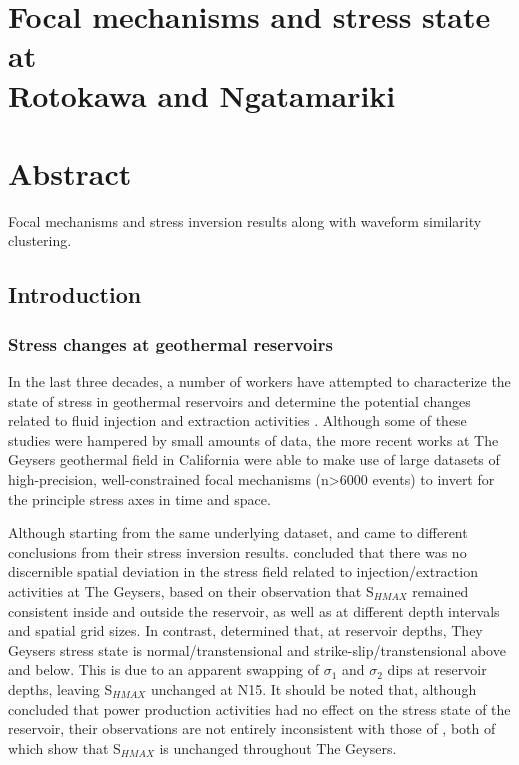 \chapter[Focal mechanisms and stress state at Rotokawa and Ngatamariki]{Focal mechanisms and stress state at \\Rotokawa and Ngatamariki}

\chapter*{Abstract}
Focal mechanisms and stress inversion results along with waveform
similarity clustering.

\section{Introduction}

\subsection{Stress changes at geothermal reservoirs}
In the last three decades, a number of workers have attempted to characterize the state of stress in geothermal reservoirs and determine the potential changes related to fluid injection and extraction activities \citep{oppenheimer1986extensional,feng1998microseismicity,sasaki2002determination,bohnhoff2004fault,Mart_nez_Garz_n_2013,Boyle_2014,Mart_nez_Garz_n_2014,Mart_nez_Garz_n_2017}. Although some of these studies were hampered by small amounts of data, the more recent works \citep[specifically][]{Mart_nez_Garz_n_2013,Boyle_2014,Mart_nez_Garz_n_2014,Mart_nez_Garz_n_2017} at The Geysers geothermal field in California were able to make use of large datasets of high-precision, well-constrained focal mechanisms (n\textgreater6000 events) to invert for the principle stress axes in time and space.

Although starting from the same underlying dataset, \citet{Mart_nez_Garz_n_2013} and \citet{Boyle_2014} came to different conclusions from their stress inversion results. \citet{Boyle_2014} concluded that there was no discernible spatial deviation in the stress field related to injection\slash{extraction} activities at The Geysers, based on their observation that S$_{HMAX}$ remained consistent inside and outside the reservoir, as well as at different depth intervals and spatial grid sizes. In contrast, \citet{Mart_nez_Garz_n_2013} determined that, at reservoir depths, They Geysers stress state is normal\slash{transtensional} and strike-slip\slash{transtensional} above and below. This is due to an apparent swapping of $\sigma_1$ and $\sigma_2$ dips at reservoir depths, leaving S$_{HMAX}$ unchanged at N15. It should be noted that, although \citet{Boyle_2014} concluded that power production activities had no effect on the stress state of the reservoir, their observations are not entirely inconsistent with those of \citet{Mart_nez_Garz_n_2013}, both of which show that S$_{HMAX}$ is unchanged throughout The Geysers.

